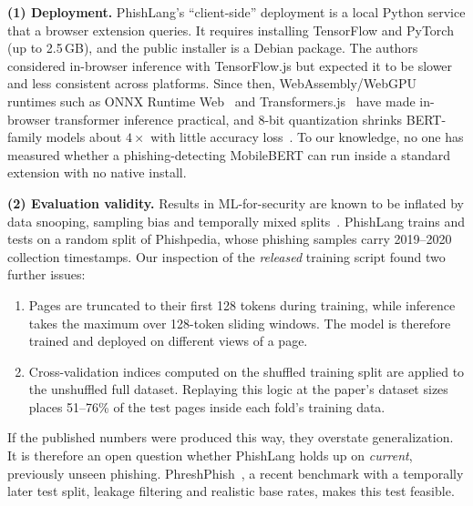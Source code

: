 \documentclass[11pt]{article}
\begin{document}
\textbf{(1) Deployment.} PhishLang's ``client-side'' deployment is a local Python service that a browser extension queries. It requires installing TensorFlow and PyTorch (up to 2.5\,GB), and the public installer is a Debian package. The authors considered in-browser inference with TensorFlow.js but expected it to be slower and less consistent across platforms. Since then, WebAssembly/WebGPU runtimes such as ONNX Runtime Web~\cite{onnxruntime} and Transformers.js~\cite{transformersjs} have made in-browser transformer inference practical, and 8-bit quantization shrinks BERT-family models about $4\times$ with little accuracy loss~\cite{zafrir2019q8bert,jacob2018quantization}. To our knowledge, no one has measured whether a phishing-detecting MobileBERT can run inside a standard extension with no native install.

\textbf{(2) Evaluation validity.} Results in ML-for-security are known to be inflated by data snooping, sampling bias and temporally mixed splits~\cite{arp2022dos,pendlebury2019tesseract}. PhishLang trains and tests on a random split of Phishpedia, whose phishing samples carry 2019--2020 collection timestamps. Our inspection of the \emph{released} training script found two further issues:
\begin{enumerate}[label=(\alph*)]
  \item Pages are truncated to their first 128 tokens during training, while inference takes the maximum over 128-token sliding windows. The model is therefore trained and deployed on different views of a page.
  \item Cross-validation indices computed on the shuffled training split are applied to the unshuffled full dataset. Replaying this logic at the paper's dataset sizes places 51--76\% of the test pages inside each fold's training data.
\end{enumerate}
If the published numbers were produced this way, they overstate generalization. It is therefore an open question whether PhishLang holds up on \emph{current}, previously unseen phishing. PhreshPhish~\cite{dalton2025phreshphish}, a recent benchmark with a temporally later test split, leakage filtering and realistic base rates, makes this test feasible.
\end{document}
